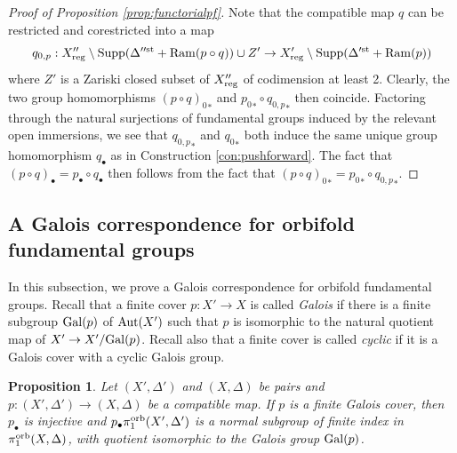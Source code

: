 \documentclass{amsart}
\newtheorem{proposition}[theorem]{Proposition}
\theoremstyle{definition}
\theoremstyle{remark}
\numberwithin{equation}{section}
\begin{document}
\begin{proof}[Proof of Proposition \ref{prop:functorialpf}]
Note that the compatible map $q$ can be restricted and corestricted into a map
$$q_{0,p}:X''_{\rm reg}\setminus {\rm Supp}(\Delta''^{\rm st} + {\rm Ram}(p\circ q))\cup Z' \to X'_{\rm reg}\setminus {\rm Supp}(\Delta'^{\rm st} + {\rm Ram}(p))$$
where $Z'$ is a Zariski closed subset of $X''_{\rm reg}$ of codimension at least 2.
Clearly, the two group homomorphisms ${(p\circ q)_0}_*$ and ${p_0}_*\circ {q_{0,p}}_*$ then coincide. Factoring through the natural surjections of fundamental groups induced by the relevant open immersions, we see that ${q_{0,p}}_*$ and ${q_0}_*$ both induce the same unique group homomorphism $q_{\bullet}$ as in Construction \ref{con:pushforward}. The fact that $(p\circ q)_{\bullet}=p_{\bullet}\circ q_{\bullet}$ then follows from the fact that ${(p\circ q)_0}_* = {p_0}_*\circ {q_{0,p}}_*$.
\end{proof}

\subsection{A Galois correspondence for orbifold fundamental groups}\label{subsec:galois}
In this subsection, we prove a Galois correspondence for orbifold fundamental groups.
Recall that a finite cover $p:X'\to X$ is called {\it Galois} if there is a finite subgroup ${\rm Gal}(p)$ of ${\rm Aut}(X')$ such that $p$ is isomorphic to the natural quotient map of $X'\to X'/{\rm Gal}(p)$. 
Recall also that a finite cover is called {\it cyclic} if it is a Galois cover with a cyclic Galois group.

\begin{proposition}\label{prop:pushforward}
    Let $(X',\Delta')$ and $(X,\Delta)$ be pairs and $p:(X',\Delta') \to (X,\Delta)$ be a compatible map. 
    If $p$ is a finite Galois cover, then $p_{\bullet}$ is injective and $p_{\bullet}\pi_1^{\rm orb}(X',\Delta')$ is a normal subgroup of finite index in $\pi_1^{\rm orb}(X,\Delta)$, with quotient isomorphic to the Galois group ${\rm Gal}(p)$.  
\end{proposition}
\end{document}
